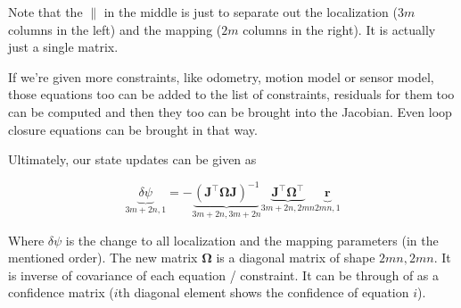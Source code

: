 Note that the $\parallel$ in the middle is just to separate out the localization ($3m$ columns in the left) and the mapping ($2m$ columns in the right). It is actually just a single matrix.

If we're given more constraints, like odometry, motion model or sensor model, those equations too can be added to the list of constraints, residuals for them too can be computed and then they too can be brought into the Jacobian. Even loop closure equations can be brought in that way.

Ultimately, our state updates can be given as

\begin{equation}
    \underbrace{\delta \psi}_{3m+2n, 1} = - \underbrace{\mathbf{(J^\top \Omega J)}^{-1}}_{3m+2n, 3m+2n} \underbrace{\mathbf{J^\top \Omega^\top}}_{3m+2n, 2mn} \underbrace{\mathbf{r}}_{2mn, 1}
\end{equation}

Where $\delta \psi$ is the change to all localization and the mapping parameters (in the mentioned order). The new matrix $\mathbf{\Omega}$ is a diagonal matrix of shape $2mn, 2mn$. It is inverse of covariance of each equation / constraint. It can be through of as a confidence matrix ($i$th diagonal element shows the confidence of equation $i$).
